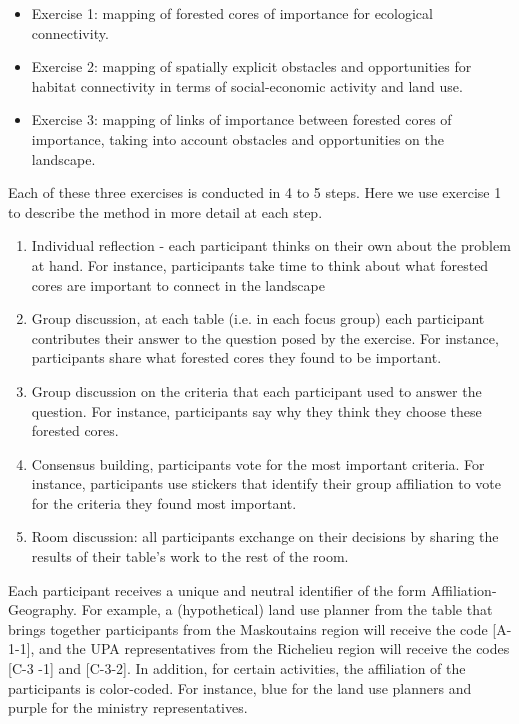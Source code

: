 \begin{itemize}
  \item Exercise 1: mapping of forested cores of importance for ecological connectivity.
  \item Exercise 2: mapping of spatially explicit obstacles and opportunities for habitat connectivity in terms of social-economic activity and land use.
  \item Exercise 3: mapping of links of importance between forested cores of importance, taking into account obstacles and opportunities on the landscape.
\end{itemize}

Each of these three exercises is conducted in 4 to 5 steps. Here we use exercise 1 to describe the method in more detail at each step.

\begin{enumerate}
\item Individual reflection - each participant thinks on their own about the problem at hand. For instance, participants take time to think about what forested cores are important to connect in the landscape
\item Group discussion, at each table (i.e. in each focus group) each participant contributes their answer to the question posed by the exercise. For instance, participants share what forested cores they found to be important.
\item Group discussion on the criteria that each participant used to answer the question. For instance, participants say why they think they choose these forested cores.
\item Consensus building, participants vote for the most important criteria. For instance, participants use stickers that identify their group affiliation to vote for the criteria they found most important.
\item Room discussion: all participants exchange on their decisions by sharing the results of their table’s work to the rest of the room.
\end{enumerate}

Each participant receives a unique and neutral identifier of the form Affiliation-Geography. For example, a (hypothetical) land use planner from the table that brings together participants from the Maskoutains region will receive the code [A-1-1], and the UPA representatives from the Richelieu region will receive the codes [C-3 -1] and [C-3-2]. In addition, for certain activities, the affiliation of the participants is color-coded. For instance, blue for the land use planners and purple for the ministry representatives.

